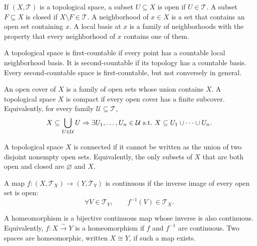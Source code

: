     \begin{definition}
        If $(X,\mathcal{T})$ is a topological space, a subset $U\subseteq X$ is
        open if $U\in\mathcal{T}$. A subset $F\subseteq X$ is closed if
        $X\setminus F\in\mathcal{T}$. A neighborhood of $x\in X$ is a set that
        contains an open set containing $x$. A local basis at $x$ is a family
        of neighborhoods with the property that every neighborhood of $x$
        contains one of them.
    \end{definition}

    \begin{definition}
        A topological space is first-countable if every point has a countable
        local neighborhood basis. It is second-countable if its topology has a
        countable basis. Every second-countable space is first-countable, but
        not conversely in general.
    \end{definition}

    \begin{definition}[Compactness]
        An open cover of $X$ is a family of open sets whose union contains
        $X$. A topological space $X$ is compact if every open cover has a finite
        subcover. Equivalently, for every family $\mathcal{U}\subseteq\mathcal{T}$,
        \[
            X\subseteq\bigcup_{U\in\mathcal{U}}U
            \Rightarrow
            \exists U_1,\dots,U_n\in\mathcal{U}
            \ \textnormal{s.t.}\
            X\subseteq U_1\cup\cdots\cup U_n.
        \]
    \end{definition}

    \begin{definition}[Connectedness]
        A topological space $X$ is connected if it cannot be written as the union
        of two disjoint nonempty open sets. Equivalently, the only subsets of
        $X$ that are both open and closed are $\varnothing$ and $X$.
    \end{definition}


    \begin{definition}
        A map $f\colon (X,\mathcal{T}_X)\to(Y,\mathcal{T}_Y)$ is continuous if the
        inverse image of every open set is open:
        \[
            \forall V\in\mathcal{T}_Y,
            \qquad
            f^{-1}(V)\in\mathcal{T}_X.
        \]
    \end{definition}

    \begin{definition}[Homeomorphism]
        A homeomorphism is a bijective continuous map whose inverse is also
        continuous. Equivalently, $f\colon X\xrightarrow{\sim}Y$ is a homeomorphism
        if $f$ and $f^{-1}$ are continuous. Two spaces are homeomorphic, written
        $X\cong Y$, if such a map exists.
    \end{definition}



